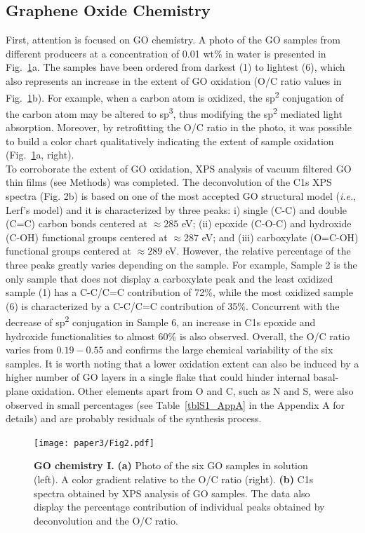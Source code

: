 \subsection{Graphene Oxide Chemistry}
First, attention is focused on GO chemistry. A photo of the GO samples from different producers at a concentration of 0.01 wt\% in water is presented in Fig.~\ref{Fig2_pap3}a. The samples have been ordered from darkest (1) to lightest (6), which also represents an increase in the extent of GO oxidation (O/C ratio values in Fig.~\ref{Fig2_pap3}b). For example, when a carbon atom is oxidized, the sp\textsuperscript{2} conjugation of the carbon atom may be altered to sp\textsuperscript{3}, thus modifying the sp\textsuperscript{2} mediated light absorption. Moreover, by retrofitting the O/C ratio in the photo, it was possible to build a color chart qualitatively indicating the extent of sample oxidation (Fig.~\ref{Fig2_pap3}a, right).\\
To corroborate the extent of GO oxidation, XPS analysis of vacuum filtered GO thin films (see Methods) was completed. The deconvolution of the C1s XPS spectra (Fig. 2b) is based on one of the most accepted GO structural model (\textit{i.e.}, Lerf's model\cite{lerf1998structure}) and it is characterized by three peaks: i) single (C-C) and double (C=C) carbon bonds centered at  $\approx285$ eV; (ii) epoxide (C-O-C) and hydroxide (C-OH) functional groups centered at $\approx287$ eV; and (iii) carboxylate (O=C-OH) functional groups centered at  $\approx289$ eV.\cite{amadei2016fabrication} However, the relative percentage of the three peaks greatly varies depending on the sample. For example, Sample 2 is the only sample that does not display a carboxylate peak and the least oxidized sample (1) has a C-C/C=C contribution of 72\%, while the most oxidized sample (6) is characterized by a C-C/C=C contribution of 35\%. Concurrent with the decrease of sp\textsuperscript{2} conjugation in Sample 6, an increase in C1s epoxide and hydroxide functionalities to almost 60\% is also observed. Overall, the O/C ratio varies from $0.19-0.55$ and confirms the large chemical variability of the six samples. It is worth noting that a lower oxidation extent can also be induced by a higher number of GO layers in a single flake that could hinder internal basal-plane oxidation. Other elements apart from O and C, such as N and S, were also observed in small percentages (see Table~\ref{tblS1_AppA}  in the Appendix A for details) and are probably residuals of the synthesis process.

\begin{figure}[t!]
  \centering
  \texttt{[image: paper3/Fig2.pdf]}
  \caption{\textbf{GO chemistry I.} \textbf{(a)}  Photo of the six GO samples in solution (left). A color gradient relative to the O/C ratio (right). \textbf{(b)} C1s spectra obtained by XPS analysis of GO samples. The data also display the percentage contribution of individual peaks obtained by deconvolution and the O/C ratio.}
  \label{Fig2_pap3}
\end{figure}

